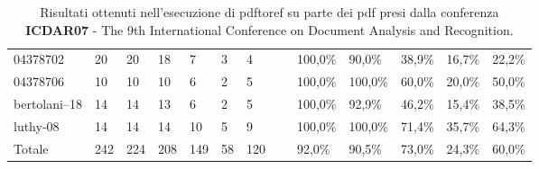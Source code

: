 \begin{table}
\begin{center}
\begin{tabular}{|l|l|l|l|l|l|l|l|l|l|l|l|l|}
04378702 & 20 & 20 & 18 & 7 & 3 & 4 & ~ & 100,0\% & 90,0\% & 38,9\% & 16,7\% & 22,2\%\\
04378706 & 10 & 10 & 10 & 6 & 2 & 5 & ~ & 100,0\% & 100,0\% & 60,0\% & 20,0\% & 50,0\%\\
bertolani--18 & 14 & 14 & 13 & 6 & 2 & 5 & ~ & 100,0\% & 92,9\% & 46,2\% & 15,4\% & 38,5\%\\
luthy-08 & 14 & 14 & 14 & 10 & 5 & 9 & ~ & 100,0\% & 100,0\% & 71,4\% & 35,7\% & 64,3\%\\ \hline
Totale & 242 & 224 & 208 & 149 & 58 & 120 & ~ & 92,0\% & 90,5\% & 73,0\% & 24,3\% & 60,0\%\\ \hline
	\end{tabular}
	\tiny{\caption{Risultati ottenuti nell'esecuzione di pdftoref su parte dei pdf presi dalla conferenza \textbf{ICDAR07} - The 9th International Conference on Document Analysis and Recognition. }}
	\end{center}
	\end{table}


